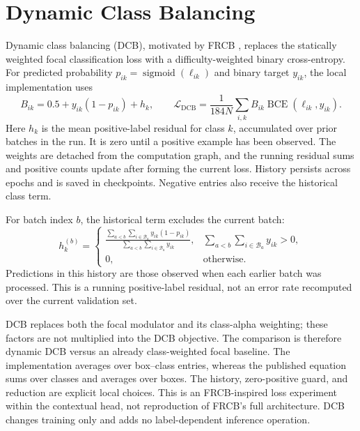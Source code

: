 \section{Dynamic Class Balancing}

Dynamic class balancing (DCB), motivated by FRCB \cite{frcb}, replaces the statically weighted focal classification loss with a difficulty-weighted binary cross-entropy. For predicted probability \(p_{ik}=\operatorname{sigmoid}(\ell_{ik})\) and binary target \(y_{ik}\), the local implementation uses
\begin{equation}\label{eq:dcb}
 B_{ik}=0.5+y_{ik}(1-p_{ik})+h_k,\qquad
 \mathcal{L}_{\mathrm{DCB}}=\frac{1}{184N}\sum_{i,k}B_{ik}\operatorname{BCE}(\ell_{ik},y_{ik}).
\end{equation}
Here \(h_k\) is the mean positive-label residual for class \(k\), accumulated over prior batches in the run. It is zero until a positive example has been observed. The weights are detached from the computation graph, and the running residual sums and positive counts update after forming the current loss. History persists across epochs and is saved in checkpoints. Negative entries also receive the historical class term.

For batch index \(b\), the historical term excludes the current batch:
\begin{equation}\label{eq:dcb-history}
 h_k^{(b)}=\begin{cases}
 \displaystyle\frac{\sum_{a<b}\sum_{i\in\mathcal B_a}y_{ik}(1-p_{ik})}
 {\sum_{a<b}\sum_{i\in\mathcal B_a}y_{ik}}, & \displaystyle\sum_{a<b}\sum_{i\in\mathcal B_a}y_{ik}>0,\\[6pt]
 0, & \text{otherwise}.
 \end{cases}
\end{equation}
Predictions in this history are those observed when each earlier batch was processed. This is a running positive-label residual, not an error rate recomputed over the current validation set.

DCB replaces both the focal modulator and its class-alpha weighting; these factors are not multiplied into the DCB objective. The comparison is therefore dynamic DCB versus an already class-weighted focal baseline. The implementation averages over box--class entries, whereas the published equation sums over classes and averages over boxes. The history, zero-positive guard, and reduction are explicit local choices. This is an FRCB-inspired loss experiment within the contextual head, not reproduction of FRCB's full architecture. DCB changes training only and adds no label-dependent inference operation.

